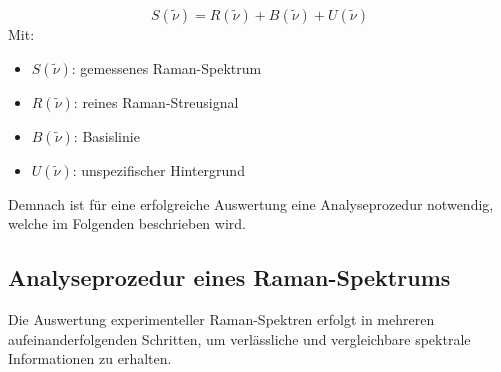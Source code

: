 \begin{equation}
    S(\tilde{\nu}) = R(\tilde{\nu}) + B(\tilde{\nu}) + U(\tilde{\nu})
\end{equation}
Mit:
\begin{itemize}
    \item $S(\tilde{\nu})$: gemessenes Raman-Spektrum 
    \item $R(\tilde{\nu})$: reines Raman-Streusignal 
    \item $B(\tilde{\nu})$: Basislinie 
    \item $U(\tilde{\nu})$: unspezifischer Hintergrund 
\end{itemize}

Demnach ist für eine erfolgreiche Auswertung eine Analyseprozedur notwendig, welche im Folgenden beschrieben wird.

\subsection{Analyseprozedur eines Raman-Spektrums}

Die Auswertung experimenteller Raman-Spektren erfolgt in mehreren aufeinanderfolgenden Schritten, um verlässliche und vergleichbare spektrale Informationen zu erhalten.

